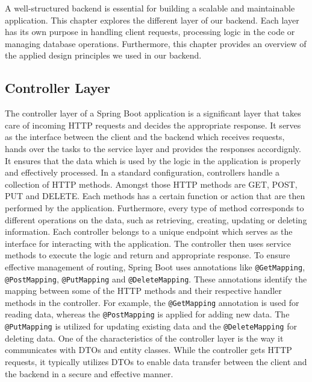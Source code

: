 \Author{\daAuthorThree}

    A well-structured backend is essential for building a scalable and maintainable application. This chapter explores the different layer of our backend. Each layer has its own purpose in handling client requests, processing logic in the code or managing database operations. Furthermore, this chapter provides an overview of the applied design principles we used in our backend.

    \subsection{Controller Layer}
    The controller layer of a Spring Boot application is a significant layer that takes care of incoming HTTP requests and decides the appropriate response. It serves as the interface between the client and the backend which receives requests, hands over the tasks to the service layer and provides the responses accordignly. It ensures that the data which is used by the logic in the application is properly and effectively processed. \newline
    In a standard configuration, controllers handle a collection of HTTP methods. Amongst those HTTP methods are GET, POST, PUT and DELETE. Each methods has a certain function or action that are then performed by the application. Furthermore, every type of method corresponds to different operations on the data, such as retrieving, creating, updating or deleting information. Each controller belongs to a unique endpoint which serves as the interface for interacting with the application. The controller then uses service methods to execute the logic and return and appropriate response. \newline
    To ensure effective management of routing, Spring Boot uses annotations like \texttt{@GetMapping}, \texttt{@PostMapping}, \texttt{@PutMapping} and \texttt{@DeleteMapping}. These annotations identify the mapping between some of the HTTP methods and their respective handler methods in the controller. For example, the \texttt{@GetMapping} annotation is used for reading data, whereas the \texttt{@PostMapping} is applied for adding new data. The \texttt{@PutMapping} is utilized for updating existing data and the \texttt{@DeleteMapping} for deleting data. \newline
    One of the characteristics of the controller layer is the way it communicates with DTOs and entity classes. While the controller gets HTTP requests, it typically utilizes DTOs to enable data transfer between the client and the backend in a secure and effective manner.

